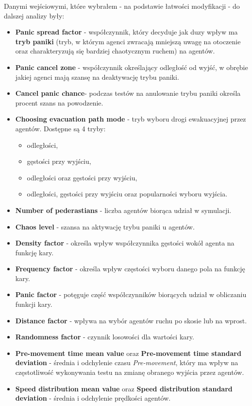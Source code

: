 \documentclass[12pt]{aghdpl}
\begin{document}
		Danymi wejściowymi, które wybrałem - na podstawie łatwości modyfikacji - do dalszej analizy były:\label{dane_do_dalszej_analizy}
		
		\begin{itemize}
		\item \textbf{Panic spread factor} - współczynnik, który decyduje jak duzy wpływ ma \textbf{tryb paniki} (tryb, w którym agenci zwracają mniejszą uwagę na otoczenie oraz charakteryzują się bardziej chaotycznym ruchem) na agentów.
		\item \textbf{Panic cancel zone} - współczynnik określający odległość od wyjść, w obrębie jakiej agenci mają szansę na deaktywację trybu paniki.
		\item \textbf{Cancel panic chance}- podczas testów na anulowanie trybu paniki określa procent szans na powodzenie.
		\item \textbf{Choosing evacuation path mode} - tryb wyboru drogi ewakuacyjnej przez agentów. Dostępne są 4 tryby:
			\begin{itemize}
			\item odległości,
			\item gęstości przy wyjściu,
			\item odległości oraz gęstości przy wyjściu,
			\item odległości, gęstości przy wyjściu oraz popularności wyboru wyjścia.
			\end{itemize}
		\item \textbf{Number of pederastians} - liczba agentów biorąca udział w symulacji.
		\item \textbf{Chaos level} - szansa na aktywację trybu paniki u agentów.
		\item \textbf{Density factor} - określa wpływ współczynnika gęstości wokół agenta na funkcję kary.
		\item \textbf{Frequency factor} - określa wpływ częstości wyboru danego pola na funkcję kary.
		\item \textbf{Panic factor} - potęguje część współczynników biorących udział w obliczaniu funkcji kary. 
		\item \textbf{Distance factor} - wpływa na wybór agentów ruchu po skosie lub na wprost.
		\item \textbf{Randomness factor} - czynnik losowości dla wartości kary.
		\item \textbf{Pre-movement time mean value} oraz \textbf{Pre-movement time standard deviation} - średnia i odchylenie czasu \textit{Pre-movement}, który ma wpływ na częstotliwość wykonywania testu na zmianę obranego wyjścia przez agentów.
		\item \textbf{Speed distribution mean value} oraz \textbf{Speed distribution standard deviation} - średnia i odchylenie prędkości agentów.
		\end{itemize}
		
\end{document}
